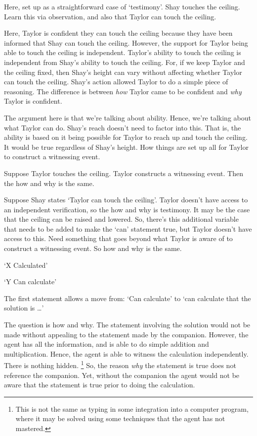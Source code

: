 \documentclass[10pt]{article}
\begin{document}
Here, set up as a straightforward case of `testimony'.
Shay touches the ceiling.
Learn this via observation, and also that Taylor can touch the ceiling.

Here, Taylor is confident they can touch the ceiling because they have been informed that Shay can touch the ceiling.
However, the support for Taylor being able to touch the ceiling is independent.
Taylor's ability to touch the ceiling is independent from Shay's ability to touch the ceiling.
For, if we keep Taylor and the ceiling fixed, then Shay's height can vary without affecting whether Taylor can touch the ceiling.
Shay's action allowed Taylor to do a simple piece of reasoning.
The difference is between \emph{how} Taylor came to be confident and \emph{why} Taylor is confident.

The argument here is that we're talking about ability.
Hence, we're talking about what Taylor can do.
Shay's reach doesn't need to factor into this.
That is, the ability is based on it being possible for Taylor to reach up and touch the ceiling.
It would be true regardless of Shay's height.
How things are set up all for Taylor to construct a witnessing event.

Suppose Taylor touches the ceiling.
Taylor constructs a witnessing event.
Then the how and why is the same.

Suppose Shay states `Taylor can touch the ceiling'.
Taylor doesn't have access to an independent verification, so the how and why is testimony.
It may be the case that the ceiling can be raised and lowered.
So, there's this additional variable that needs to be added to make the `can' statement true, but Taylor doesn't have access to this.
Need something that goes beyond what Taylor is aware of to construct a witnessing event.
So how and why is the same.




`X Calculated'

`Y Can calculate'

The first statement allows a move from: `Can calculate' to `can calculate that the solution is \dots'

The question is how and why.
The statement involving the solution would not be made without appealing to the statement made by the companion.
However, the agent has all the information, and is able to do simple addition and multiplication.
Hence, the agent is able to witness the calculation independently.
There is nothing hidden.\nolinebreak
\footnote{
  This is not the same as typing in some integration into a computer program, where it may be solved using some techniques that the agent has not mastered.
}
So, the reason \emph{why} the statement is true does not reference the companion.
Yet, without the companion the agent would not be aware that the statement is true prior to doing the calculation.
\end{document}
